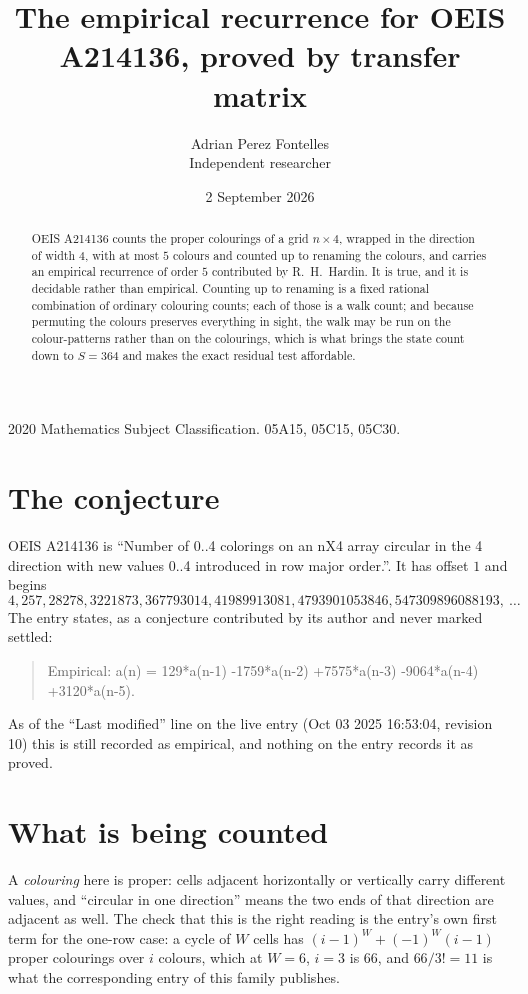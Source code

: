 \documentclass[11pt,a4paper]{article}
\title{The empirical recurrence for OEIS A214136, proved by transfer matrix}
\author{Adrian Perez Fontelles\\ \small Independent researcher}
\date{2 September 2026}
\theoremstyle{plain}
\theoremstyle{definition}
\begin{document}
\maketitle

\begin{abstract}
OEIS A214136 counts the proper colourings of a grid $n\times4$, wrapped in the direction of width $4$, with at most $5$ colours and
counted up to renaming the colours, and carries an empirical recurrence of order $5$
contributed by R.~H.~Hardin. It is true, and it is decidable rather than empirical. Counting
up to renaming is a fixed rational combination of ordinary colouring counts; each of those is
a walk count; and because permuting the colours preserves everything in sight, the walk may be
run on the colour-patterns rather than on the colourings, which is what brings the state count
down to $S=364$ and makes the exact residual test affordable.
\end{abstract}

\noindent\small 2020 Mathematics Subject Classification. 05A15, 05C15, 05C30.\normalsize

\section{The conjecture}

OEIS A214136 is ``Number of 0..4 colorings on an nX4 array circular in the 4 direction with new values 0..4 introduced in row major order.''. It has offset $1$ and begins
\[
4, 257, 28278, 3221873, 367793014, 41989913081, 4793901053846, 547309896088193,\ \dots
\]
The entry states, as a conjecture contributed by its author and never marked settled:
\begin{quote}
Empirical: a(n) = 129*a(n-1) -1759*a(n-2) +7575*a(n-3) -9064*a(n-4) +3120*a(n-5).
\end{quote}
As of the ``Last modified'' line on the live entry (Oct 03 2025 16:53:04, revision 10) this is still
recorded as empirical, and nothing on the entry records it as proved.

\section{What is being counted}

A \emph{colouring} here is proper: cells adjacent horizontally or vertically carry different
values, and ``circular in one direction'' means the two ends of that direction are adjacent as
well. The check that this is the right reading is the entry's own first term for the
one-row case: a cycle of $W$ cells has $(i-1)^W+(-1)^W(i-1)$ proper colourings over $i$
colours, which at $W=6$, $i=3$ is $66$, and $66/3!=11$ is what the corresponding entry of this
family publishes.
\end{document}
